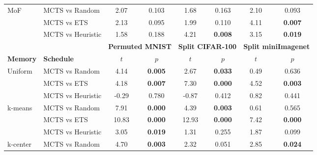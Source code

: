 \begin{tabular}{llcccccc}
\multirow{3}{*}{MoF}      & MCTS vs Random    & 2.07            & 0.103           & 1.68               & 0.163               & 2.10              & 0.093            \\
                          & MCTS vs ETS       & 2.13            & 0.095           & 1.99               & 0.110               & 4.11              & \textbf{0.007}            \\
                          & MCTS vs Heuristic   & 1.58            & 0.188           & 4.21               & \textbf{0.008}               & 3.15              & \textbf{0.019}      \\
\bottomrule \toprule
                          &                   & \multicolumn{2}{c}{\textbf{Permuted MNIST}} & \multicolumn{2}{c}{\textbf{Split CIFAR-100}} & \multicolumn{2}{c}{\textbf{Split miniImagenet}} \\ 
\cmidrule(lr){3-4} \cmidrule(lr){5-6} \cmidrule(lr){7-8}
\textbf{Memory}           & \textbf{Schedule} & $t$                   & $p$                     & $t$                   & $p$                      & $t$                     & $p$                       \\ \midrule
\multirow{3}{*}{Uniform}  & MCTS vs Random    & 4.14              & \textbf{0.005}            & 2.67              & \textbf{0.033}             & 0.49                & 0.636              \\
                          & MCTS vs ETS       & 4.18              & \textbf{0.007}            & 7.30              & \textbf{0.000}             & 4.52                & \textbf{0.003}              \\ 
                          & MCTS vs Heuristic   & -0.29             & 0.780            & -0.87             & 0.412             & 0.82                & 0.441              \\ \midrule
\multirow{3}{*}{k-means}  & MCTS vs Random    & 7.91              & \textbf{0.000}            & 4.39              & \textbf{0.003}             & 0.61                & 0.565              \\
                          & MCTS vs ETS       & 10.83             & \textbf{0.000}            & 12.93             & \textbf{0.000}             & 7.42                & \textbf{0.000}              \\
                          & MCTS vs Heuristic   & 3.05              & \textbf{0.019}            & 1.31              & 0.255             & 1.87                & 0.099              \\ \midrule
\multirow{3}{*}{k-center} & MCTS vs Random    & 4.70              & \textbf{0.003}            & 2.32              & 0.051             & 2.85                & \textbf{0.024}              \\

\end{tabular}
